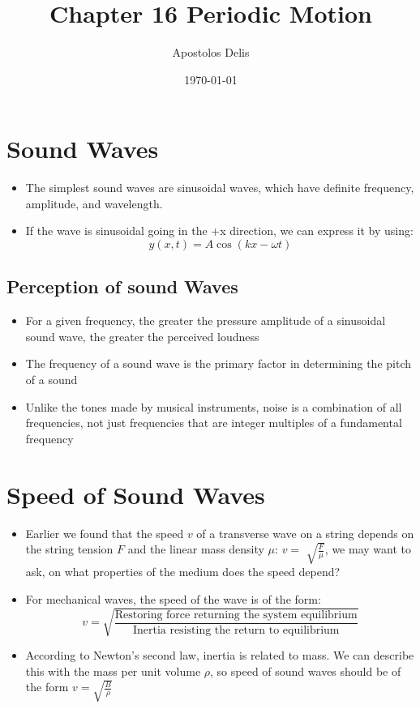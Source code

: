\documentclass[11pt, a4paper]{article}
\begin{document}
\title{Chapter 16 Periodic Motion}
\author{Apostolos Delis}
\date{\today}
\maketitle

\tableofcontents
\section[16.1, Sound Waves]{Sound Waves}
\begin{itemize}
    \item The simplest sound waves are sinusoidal waves, which have definite frequency,
        amplitude, and wavelength.
    \item  If the wave is sinusoidal going in the +x direction, we can express it by
        using:
        \begin{equation}
            y(x,t) = A\cos(kx -\omega t)
        \end{equation}
\end{itemize}
\subsection{Perception of sound Waves}
\begin{itemize}
    \item For a given frequency, the greater the pressure amplitude of a sinusoidal
        sound wave, the greater the perceived loudness
    \item The frequency of a sound wave is the primary factor in determining the pitch of
        a sound
    \item Unlike the tones made by musical instruments, noise is a combination of all
        frequencies, not just frequencies that are integer multiples of a fundamental
        frequency
\end{itemize}
\section[16.2, Speed of Sound Waves]{Speed of Sound Waves}
\begin{itemize}
    \item Earlier we found that the speed $v$ of a transverse wave on a string depends on
        the string tension $F$ and the linear mass density $\mu$: $v =$
        $\sqrt{\frac{F}{\mu}}$, we may want to ask, on what properties of the medium does
        the speed depend?
    \item For mechanical waves, the speed of the wave is of the form:
        \begin{equation}
            v = \sqrt{\frac{\text{Restoring force returning the system equilibrium}}
            {\text{Inertia resisting the return to equilibrium}}}
        \end{equation}
    \item According to Newton’s second law, inertia is related to mass. We can describe
        this with the mass per unit volume $\rho$, so speed of sound waves should be of
        the form $v = \sqrt{\frac{B}{\rho}}$
\end{itemize}
\end{document}
